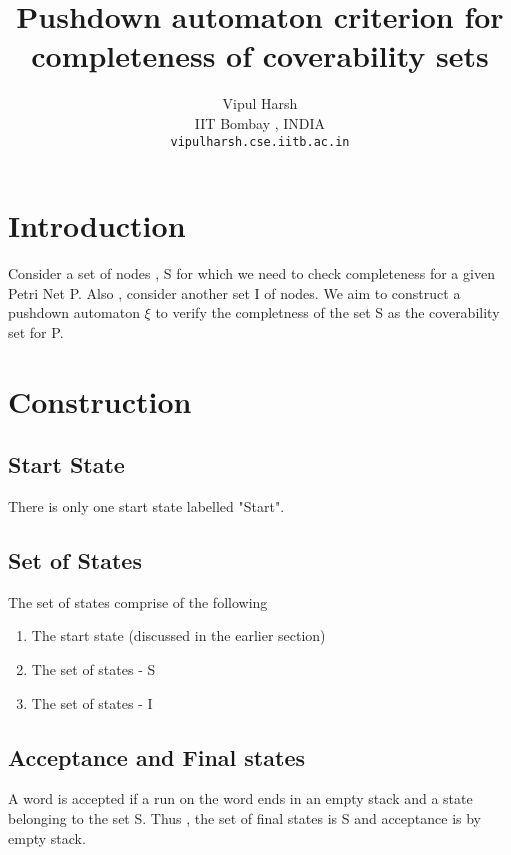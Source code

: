\documentclass[a4paper,10pt]{article}
\title{Pushdown automaton criterion for completeness of coverability sets}
\author{Vipul Harsh\\
        IIT Bombay , INDIA\\
        \texttt{vipulharsh.cse.iitb.ac.in}\\[0.3 cm]
        }
\begin{document}
\maketitle

\section{Introduction}
  Consider a set of nodes , S for which we need to check completeness for a given Petri Net P. Also , consider 
  another set I of nodes.
  We aim to construct a pushdown automaton $\xi$  to verify the completness of the set S as the coverability 
  set for P.  
  
\section{Construction}
  \subsection{Start State} 
    There is only one start state labelled "Start".
    \newline
    \begin{center}
    \end{center}
    
  \subsection{Set of States}
    The set of states comprise of the following
    \begin{enumerate}
      \item  The start state (discussed in the earlier section)
      \item  The set of states - S
      \item  The set of states - I
    \end{enumerate}
      
   \subsection{Acceptance and Final states}
     A word is accepted if a run on the word ends in an empty stack and a state belonging to the set S.
     Thus , the set of final states is S and acceptance is by empty stack.
     
\end{document}

